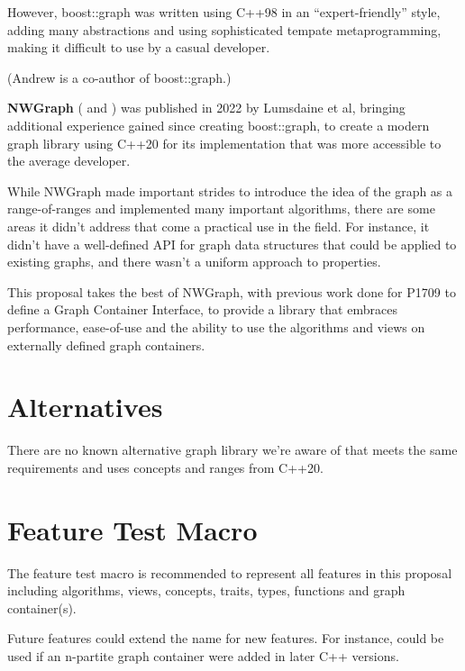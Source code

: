 However, boost::graph was written using C++98 in an ``expert-friendly'' style, adding many abstractions and using sophisticated tempate metaprogramming, making it difficult to use by a casual developer.

(Andrew is a co-author of boost::graph.)

\medskip

\textbf{NWGraph} (\cite{REF_nwgraph_library} and \cite{REF_nwgraph_paper}) was published in 2022
by Lumsdaine et al, bringing additional experience gained since creating boost::graph, to create a modern graph library using C++20 for its implementation 
that was more accessible to the average developer. %

While NWGraph made important strides to introduce the idea of the graph as a range-of-ranges and implemented many important algorithms,
there are some areas it didn't address that come a practical use in the field. For instance, it didn't have a well-defined API for graph
data structures that could be applied to existing graphs, and there wasn't a uniform approach to properties.

This proposal takes the best of NWGraph, with previous work done for P1709 to define a Graph Container Interface, to provide a library that
embraces performance, ease-of-use and the ability to use the algorithms and views on externally defined graph containers.

\section{Alternatives}
There are no known alternative graph library we're aware of that meets the same requirements and uses concepts and ranges from C++20.


\section{Feature Test Macro}
The  feature test macro is recommended to represent all features in this proposal including algorithms, views, concepts, traits, types, functions and graph container(s).

Future features could extend the name for new features. For instance,  could be used if an n-partite graph container were added in later C++ versions.

